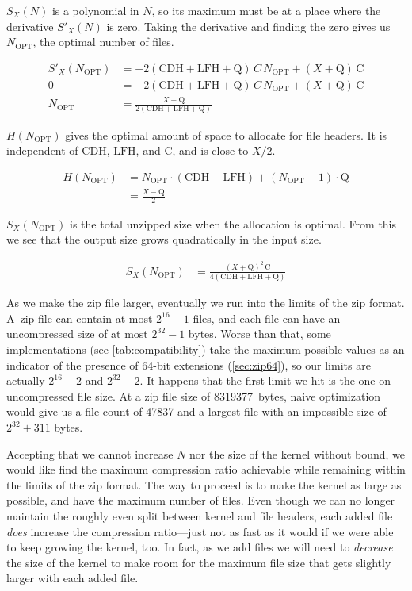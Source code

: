 \documentclass[letterpaper,twocolumn,10pt]{article}
\newcommand{\CDH}{\mathrm{CDH}}
\newcommand{\LFH}{\mathrm{LFH}}
\newcommand{\Q}{\mathrm{Q}}
\newcommand{\C}{\mathrm{C}}
\newcommand{\OPT}{\mathrm{OPT}}
\begin{document}
$S_X(N)$
is a polynomial in $N$,
so its maximum must be at a place where the derivative
$S'_X(N)$
is zero.
Taking the derivative and finding the zero gives us
$N_\OPT$,
the optimal number of files.

\begin{align*}
S'_X(N_\OPT) &= - 2 (\CDH + \LFH + \Q) \, C \, N_\OPT + (X + \Q) \, \C \\
           0 &= - 2 (\CDH + \LFH + \Q) \, C \, N_\OPT + (X + \Q) \, \C \\
     N_\OPT  &= \frac{X + \Q}{2 (\CDH + \LFH + \Q)}
\end{align*}

$H(N_\OPT)$
gives the optimal amount of space to allocate for file headers.
It is independent of $\CDH$, $\LFH$, and $\C$,
and is close to $X/2$.

\begin{align*}
H(N_\OPT) &= N_\OPT\cdot(\CDH + \LFH) + (N_\OPT - 1)\cdot\Q \\
          &= \frac{X - \Q}{2}
\end{align*}

$S_X(N_\OPT)$
is the total unzipped size
when the allocation is optimal.
From this we see that the output size grows quadratically
in the input size.

\begin{align}
\label{eq:opt}
S_X(N_\OPT) &= \frac{(X + \Q)^2 \, \C}{4(\CDH + \LFH + \Q)}
\end{align}

As we make the zip file larger,
eventually we run into the limits of the zip format.
A~zip file can contain at most $2^{16}-1$ files,
and each file can have an uncompressed size of at most $2^{32}-1$ bytes.
Worse than that,
some implementations (see \autoref{tab:compatibility})
take the maximum possible values
as an indicator of the presence of 64-bit extensions (\autoref{sec:zip64}),
so our limits are actually $2^{16}-2$ and $2^{32}-2$.
It happens that the first limit we hit is the one on uncompressed file size.
At a zip file size of \SI{8319377}{bytes},
naive optimization would give us a file count of \num{47837}
and a largest file with an impossible size of
$2^{32}+311$ bytes.
% 
% 

Accepting that we cannot increase $N$ nor the size of the kernel without bound,
we would like find the maximum compression ratio achievable
while remaining within the limits of the zip format.
The way to proceed is to make the kernel as large as possible,
and have the maximum number of files.
Even though we can no longer maintain the roughly even split
between kernel and file headers,
each added file \emph{does} increase the compression ratio---just
not as fast as it would if we were able to keep growing the kernel, too.
In fact, as we add files we will need to \emph{decrease} the size of the kernel
to make room for the maximum file size
that gets slightly larger with each added file.
\end{document}
